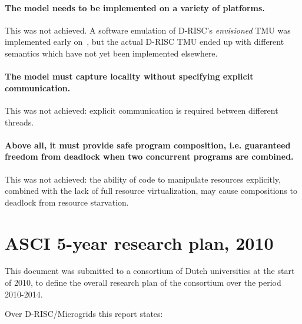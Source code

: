 \paragraph{The model needs to be implemented on a variety of platforms.} This was not achieved. 
A software emulation of D-RISC's \emph{envisioned} TMU was implemented early on~\cite{tol.09.jsa}, but
the actual D-RISC TMU ended up with different semantics which have not yet been implemented elsewhere.

\paragraph{The model must capture locality without specifying explicit communication.}
This was not achieved: explicit communication is required between different threads.

\paragraph{Above all, it must provide safe program composition, i.e. guaranteed freedom from deadlock
when two concurrent programs are combined.}
This was not achieved: the ability of code to manipulate resources explicitly, combined with the lack
of full resource virtualization, may cause compositions to deadlock from resource starvation. 

\section{ASCI 5-year research plan, 2010}

This document was submitted to a consortium of Dutch universities
at the start of 2010, to define the overall research plan of the consortium
over the period 2010-2014.

Over D-RISC/Microgrids this report states:

